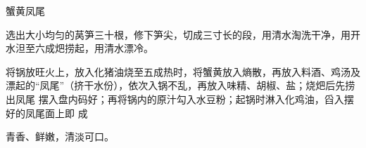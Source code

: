 \begin{recipe}{蟹黄凤尾}

\ingredients


\preparation

\step 选出大小均匀的莴笋三十根，修下笋尖，切成三寸长的段，用清水淘洗干净，用开
水泹至六成𤆵捞起，用清水漂冷。

\step 将锅放旺火上，放入化猪油烧至五成热时，将蟹黄放入熵散，再放入料酒、鸡汤及
漂起的“凤尾”（挤干水份），依次入锅不乱，再放入味精、胡椒、盐；烧𤆵后先捞出凤尾
摆入盘内码好；再将锅内的原汁勾入水豆粉；起锅时淋入化鸡油，舀入摆好的凤尾面上即
成

\features

青香、鲜嫩，清淡可口。

\end{recipe}

